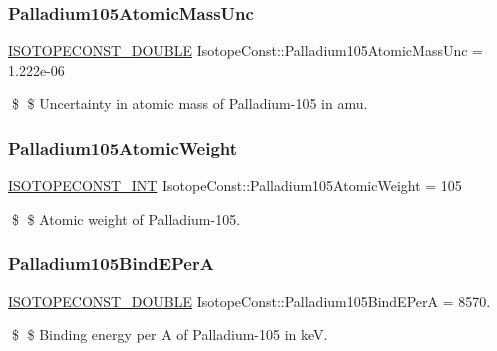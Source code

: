 \subsubsection{\texorpdfstring{Palladium105\+Atomic\+Mass\+Unc}{Palladium105AtomicMassUnc}}
{\footnotesize\ttfamily \mbox{\hyperlink{group___isotope_const-_macros_ga8f45a7272ce02c0b4c65c44636ed719a}{I\+S\+O\+T\+O\+P\+E\+C\+O\+N\+S\+T\+\_\+\+D\+O\+U\+B\+LE}} Isotope\+Const\+::\+Palladium105\+Atomic\+Mass\+Unc = 1.\+222e-\/06}

\$ \$ Uncertainty in atomic mass of Palladium-\/105 in amu. \mbox{\label{group___isotope_const-_palladium-_pd105_ga1015b0fcfa7619eb95e595579ac415cd}} 
\subsubsection{\texorpdfstring{Palladium105\+Atomic\+Weight}{Palladium105AtomicWeight}}
{\footnotesize\ttfamily \mbox{\hyperlink{group___isotope_const-_macros_ga5f18360b3e99483a35c32d789e62621c}{I\+S\+O\+T\+O\+P\+E\+C\+O\+N\+S\+T\+\_\+\+I\+NT}} Isotope\+Const\+::\+Palladium105\+Atomic\+Weight = 105}

\$ \$ Atomic weight of Palladium-\/105. \mbox{\label{group___isotope_const-_palladium-_pd105_ga2f981c76d52bf2076003f5739e10f52b}} 
\subsubsection{\texorpdfstring{Palladium105\+Bind\+E\+PerA}{Palladium105BindEPerA}}
{\footnotesize\ttfamily \mbox{\hyperlink{group___isotope_const-_macros_ga8f45a7272ce02c0b4c65c44636ed719a}{I\+S\+O\+T\+O\+P\+E\+C\+O\+N\+S\+T\+\_\+\+D\+O\+U\+B\+LE}} Isotope\+Const\+::\+Palladium105\+Bind\+E\+PerA = 8570.}

\$ \$ Binding energy per A of Palladium-\/105 in keV. \mbox{\label{group___isotope_const-_palladium-_pd105_gaeb8380a99b62c14846a91b2d8ff9f563}} 
